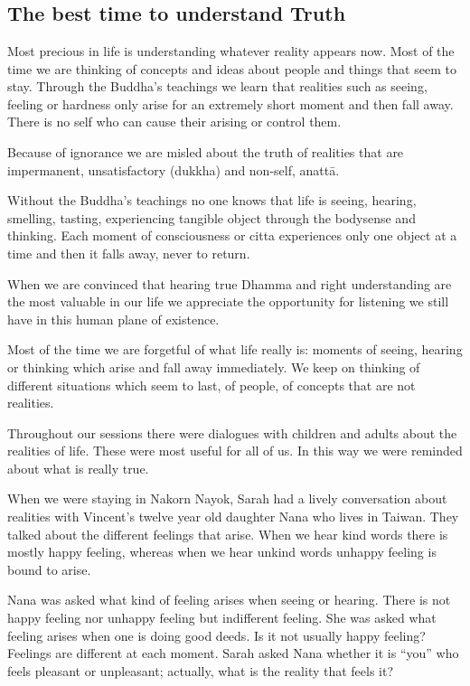 \chapter[The best time to understand Truth]{}
\section*{The best time to understand Truth}

Most precious in life is understanding whatever reality appears now.
Most of the time we are thinking of concepts and ideas about people and
things that seem to stay. Through the Buddha's teachings we learn that
realities such as seeing, feeling or hardness only arise for an
extremely short moment and then fall away. There is no self who can
cause their arising or control them.

Because of ignorance we are misled about the truth of realities that are
impermanent, unsatisfactory (dukkha) and non-self, anattā.

Without the Buddha's teachings no one knows that life is seeing,
hearing, smelling, tasting, experiencing tangible object through the
bodysense and thinking. Each moment of consciousness or citta
experiences only one object at a time and then it falls away, never to
return.

When we are convinced that hearing true Dhamma and right understanding
are the most valuable in our life we appreciate the opportunity for
listening we still have in this human plane of existence.

Most of the time we are forgetful of what life really is: moments of
seeing, hearing or thinking which arise and fall away immediately. We
keep on thinking of different situations which seem to last, of people,
of concepts that are not realities.

Throughout our sessions there were dialogues with children and adults
about the realities of life. These were most useful for all of us. In
this way we were reminded about what is really true.

When we were staying in Nakorn Nayok, Sarah had a lively conversation
about realities with Vincent's twelve year old daughter Nana who lives
in Taiwan. They talked about the different feelings that arise. When we
hear kind words there is mostly happy feeling, whereas when we hear
unkind words unhappy feeling is bound to arise.

Nana was asked what kind of feeling arises when seeing or hearing. There
is not happy feeling nor unhappy feeling but indifferent feeling. She
was asked what feeling arises when one is doing good deeds. Is it not
usually happy feeling? Feelings are different at each moment. Sarah
asked Nana whether it is ``you'' who feels pleasant or unpleasant;
actually, what is the reality that feels it?

